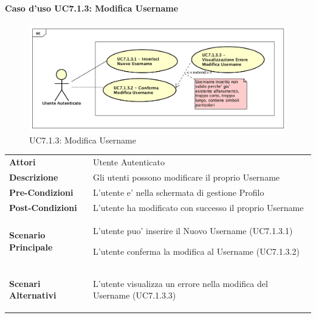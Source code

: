 \paragraph{Caso d'uso UC7.1.3:  Modifica Username}
\label{UC7_1_3}
\begin{figure}[ht]
	\centering
	\includegraphics[scale=0.45]{UML/UC7_1_3.png}
	\caption{UC7.1.3:  Modifica Username}
\end{figure}
\FloatBarrier
\begin{tabular}{ l | p{11cm}}
	\hline
	\rowcolor{Gray}
	 \multicolumn{2}{c}{UC7.1.3 - Modifica Username} \\
	 \hline
		\textbf{Attori} & Utente Autenticato \\
	\textbf{Descrizione} & Gli utenti possono modificare il proprio Username\\
	\textbf{Pre-Condizioni} & L'utente e' nella schermata di gestione Profilo\\
	\textbf{Post-Condizioni} & L'utente ha modificato con successo il proprio Username \\
	\textbf{Scenario Principale} & 
	\begin{enumerate*}[label=(\arabic*.),itemjoin={\newline}]
		\item L'utente puo' inserire il Nuovo Username (UC7.1.3.1)
		\item L'utente conferma la modifica al Username (UC7.1.3.2)
	\end{enumerate*}\\
	\textbf{Scenari Alternativi} & 
	\begin{enumerate*}[label=(\arabic*.),itemjoin={\newline}]
		\item L'utente visualizza un errore nella modifica del Username (UC7.1.3.3)
	\end{enumerate*}\\
\end{tabular}
